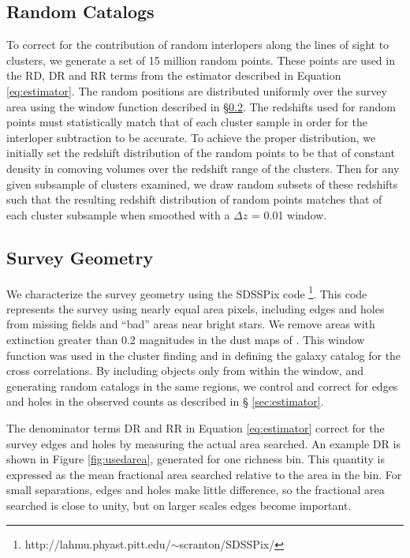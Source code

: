 \documentclass{emulateapj}
\begin{document}
\subsection{Random Catalogs} \label{sec:randoms} To correct for the
contribution of random interlopers along the lines of sight to
clusters, we generate a set of 15 million random points. These points
are used in the RD, DR and RR terms from the estimator described in
Equation \ref{eq:estimator}. The random positions are distributed
uniformly over the survey area using the window function described in
\S \ref{sec:geom}. The redshifts used for random points must
statistically match that of each cluster sample in order for the
interloper subtraction to be accurate. To achieve the proper
distribution, we initially set the redshift distribution of the random
points to be that of constant density in comoving volumes over the
redshift range of the clusters. Then for any given subsample of
clusters examined, we draw random subsets of these redshifts such that
the resulting redshift distribution of random points matches that of
each cluster subsample when smoothed with a $\Delta z$ = 0.01 window.




\subsection{Survey Geometry} \label{sec:geom}

We characterize the survey geometry using the SDSSPix code
\footnote{http://lahmu.phyast.pitt.edu/$\sim$scranton/SDSSPix/}. This code
represents the survey using nearly equal area pixels, including edges and holes
from missing fields and ``bad'' areas near bright stars.  We remove areas with
extinction greater than 0.2 magnitudes in the dust maps of \citet{Schlegel98}.
This window function was used in the cluster finding and in defining the galaxy
catalog for the cross correlations.  By including objects only from within the
window, and generating random catalogs in the same regions, we control and
correct for edges and holes in the observed counts as described in \S
\ref{sec:estimator}. 

The denominator terms DR and RR in Equation \ref{eq:estimator} correct
for the survey edges and holes by measuring the actual area searched.
An example DR is shown in Figure \ref{fig:usedarea}, generated for one
richness bin. This quantity is expressed as the mean fractional area
searched relative to the area in the bin. For small separations, edges
and holes make little difference, so the fractional area searched is
close to unity, but on larger scales edges become important.
\end{document}
